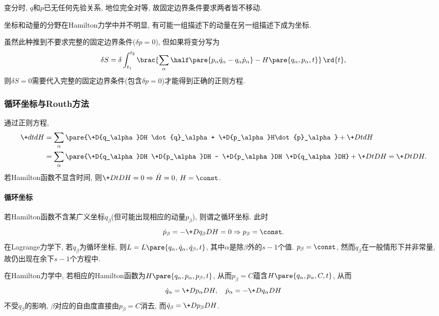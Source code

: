 \documentclass[../LectureNotes.tex]{subfiles}
\begin{document}
\begin{remark}
    变分时, $q$和$p$已无任何先验关系, 地位完全对等, 故固定边界条件要求两者皆不移动.
\end{remark}
\begin{remark}
    坐标和动量的分野在Hamilton力学中并不明显, 有可能一组描述下的动量在另一组描述下成为坐标.
\end{remark}
\begin{remark}
    虽然此种推到不要求完整的固定边界条件($\delta p = 0$), 但如果将变分写为
    \[ \delta S = \delta \int_{t_1}^{t_2} \brac{\sum_\alpha \half \pare{p_\alpha\dot{q}_\alpha - q_\alpha\dot{p}_\alpha} - H\pare{q_\alpha,p_\alpha,t}}\,\rd{t}, \]
    则$\delta S = 0$需要代入完整的固定边界条件(包含$\delta p = 0$)才能得到正确的正则方程.
\end{remark}


\subsubsection{循环坐标与Routh方法} %
\label{ssub:循环坐标与routh方法}

通过正则方程,
\begin{align*}
    \+dtdH &= \sum_\alpha\pare{\+D{q_\alpha}DH \dot{q}_\alpha + \+D{p_\alpha}H\dot{p}_\alpha} + \+DtdH \\
    &= \sum_\alpha \pare{\+D{q_\alpha}DH \+D{p_\alpha}DH - \+D{p_\alpha}DH \+D{q_\alpha}DH} + \+DtDH = \+DtDH.
\end{align*}
若Hamilton函数不显含时间, 则$\displaystyle \+DtDH = 0\Rightarrow \dot{H} = 0$, $H=\const$.

\paragraph{循环坐标} %
\label{par:循环坐标}

若Hamilton函数不含某广义坐标$q_\beta$(但可能出现相应的动量$p_\beta$), 则谓之循环坐标. 此时
\[ \dot{p}_\beta = -\+D{q_\beta}DH = 0\Rightarrow p_\beta = \const. \]
在Lagrange力学下, 若$q_\beta$为循环坐标, 则$L = L\pare{q_\alpha,\dot{q}_\alpha,\dot{q}_\beta,t}$, 其中$\alpha$是除$\beta$外的$s-1$个值. $p_\beta = \const$, 然而$\dot{q}_\beta$在一般情形下并非常量, 故仍出现在余下$s-1$个方程中.
\par
在Hamilton力学中, 若相应的Hamilton函数为$H\pare{q_\alpha,p_\alpha,p_\beta,t}$, 从而$p_\beta = C$蕴含$H\pare{q_\alpha,p_\alpha,C,t}$, 从而
\[ \dot{q}_\alpha = \+D{p_\alpha}DH,\quad \dot{p}_\alpha = -\+D{q_\alpha}DH \]
不受$\dot{q}_\beta$的影响, $\beta$对应的自由度直接由$p_\beta = C$消去, 而$\displaystyle \dot{q}_\beta = \+D{p_\beta}DH$.
\end{document}
